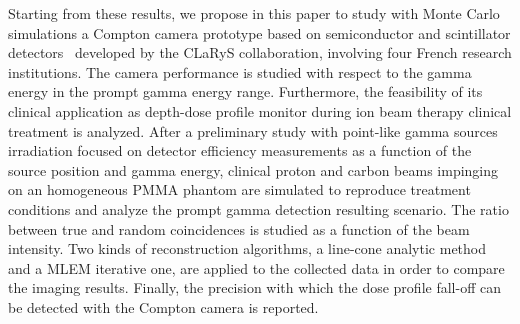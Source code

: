 Starting from these results, we propose in this paper to study with Monte Carlo simulations a Compton camera prototype based on semiconductor and scintillator detectors~\cite{krimmer:hal-01101334, Fontana2018} developed by the CLaRyS collaboration, involving four French research institutions.%
The camera performance is studied with respect to the gamma energy in the prompt gamma energy range. Furthermore, the feasibility of its clinical application as depth-dose profile monitor during ion beam therapy clinical treatment is analyzed. After a preliminary study with point-like gamma sources irradiation focused on detector efficiency measurements as a function of the source position and gamma energy, clinical proton and carbon beams impinging on an homogeneous PMMA phantom are simulated to reproduce treatment conditions and analyze the prompt gamma detection resulting scenario. The ratio between true and random coincidences is studied as a function of the beam intensity. Two kinds of reconstruction algorithms, a line-cone analytic method and a MLEM iterative one, are applied to the collected data in order to compare the imaging results. Finally, the precision with which the dose profile fall-off can be detected with the Compton camera is reported.   


